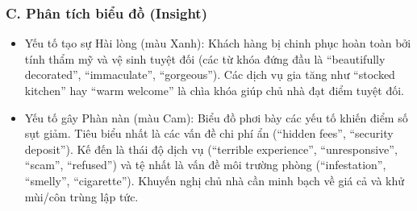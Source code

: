 \subsubsection*{C. Phân tích biểu đồ (Insight)}

\begin{itemize}
    \item Yếu tố tạo sự Hài lòng (màu Xanh): Khách hàng bị chinh phục hoàn toàn bởi tính thẩm mỹ và vệ sinh tuyệt đối (các từ khóa đứng đầu là ``beautifully decorated'', ``immaculate'', ``gorgeous''). Các dịch vụ gia tăng như ``stocked kitchen'' hay ``warm welcome'' là chìa khóa giúp chủ nhà đạt điểm tuyệt đối.
    \item Yếu tố gây Phàn nàn (màu Cam): Biểu đồ phơi bày các yếu tố khiến điểm số sụt giảm. Tiêu biểu nhất là các vấn đề chi phí ẩn (``hidden fees'', ``security deposit''). Kế đến là thái độ dịch vụ (``terrible experience'', ``unresponsive'', ``scam'', ``refused'') và tệ nhất là vấn đề môi trường phòng (``infestation'', ``smelly'', ``cigarette''). Khuyến nghị chủ nhà cần minh bạch về giá cả và khử mùi/côn trùng lập tức.
\end{itemize}
